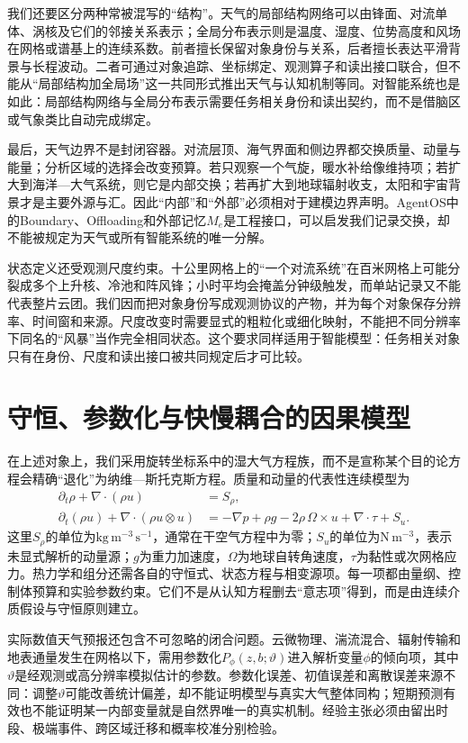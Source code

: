 我们还要区分两种常被混写的“结构”。天气的局部结构网络可以由锋面、对流单体、涡核及它们的邻接关系表示；全局分布表示则是温度、湿度、位势高度和风场在网格或谱基上的连续系数。前者擅长保留对象身份与关系，后者擅长表达平滑背景与长程波动。二者可通过对象追踪、坐标绑定、观测算子和读出接口联合，但不能从“局部结构加全局场”这一共同形式推出天气与认知机制等同。对智能系统也是如此：局部结构网络与全局分布表示需要任务相关身份和读出契约，而不是借脑区或气象类比自动完成绑定。

最后，天气边界不是封闭容器。对流层顶、海气界面和侧边界都交换质量、动量与能量；分析区域的选择会改变预算。若只观察一个气旋，暖水补给像维持项；若扩大到海洋—大气系统，则它是内部交换；若再扩大到地球辐射收支，太阳和宇宙背景才是主要外源与汇。因此“内部”和“外部”必须相对于建模边界声明。AgentOS中的Boundary、Offloading和外部记忆$M_e$是工程接口，可以启发我们记录交换，却不能被规定为天气或所有智能系统的唯一分解。

状态定义还受观测尺度约束。十公里网格上的“一个对流系统”在百米网格上可能分裂成多个上升核、冷池和阵风锋；小时平均会掩盖分钟级触发，而单站记录又不能代表整片云团。我们因而把对象身份写成观测协议的产物，并为每个对象保存分辨率、时间窗和来源。尺度改变时需要显式的粗粒化或细化映射，不能把不同分辨率下同名的“风暴”当作完全相同状态。这个要求同样适用于智能模型：任务相关对象只有在身份、尺度和读出接口被共同规定后才可比较。

\section{守恒、参数化与快慢耦合的因果模型}
\label{sec:causal_reduction_of_equations}

在上述对象上，我们采用旋转坐标系中的湿大气方程族，而不是宣称某个目的论方程会精确“退化”为纳维—斯托克斯方程。质量和动量的代表性连续模型为
\begin{align}
    \partial_t\rho+\nabla\!\cdot(\rho u)&=S_\rho,\\
    \partial_t(\rho u)+\nabla\!\cdot(\rho u\otimes u)
    &=-\nabla p+\rho g-2\rho\,\Omega\times u+\nabla\!\cdot\tau+S_u.
\end{align}
这里$S_\rho$的单位为$\mathrm{kg\,m^{-3}\,s^{-1}}$，通常在干空气方程中为零；$S_u$的单位为$\mathrm{N\,m^{-3}}$，表示未显式解析的动量源；$g$为重力加速度，$\Omega$为地球自转角速度，$\tau$为黏性或次网格应力。热力学和组分还需各自的守恒式、状态方程与相变源项。每一项都由量纲、控制体预算和实验参数约束。它们不是从认知方程删去“意志项”得到，而是由连续介质假设与守恒原则建立。

实际数值天气预报还包含不可忽略的闭合问题。云微物理、湍流混合、辐射传输和地表通量发生在网格以下，需用参数化$P_\phi(z,b;\vartheta)$进入解析变量$\phi$的倾向项，其中$\vartheta$是经观测或高分辨率模拟估计的参数。参数化误差、初值误差和离散误差来源不同：调整$\vartheta$可能改善统计偏差，却不能证明模型与真实大气整体同构；短期预测有效也不能证明某一内部变量就是自然界唯一的真实机制。经验主张必须由留出时段、极端事件、跨区域迁移和概率校准分别检验。

